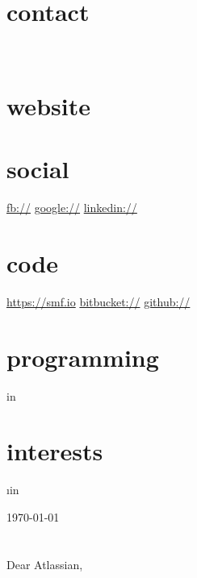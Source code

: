 \documentclass[]{fancy-cv}
\newcommand\company{Atlassian}
\begin{document}
\header{\MakeLowercase\myfirstname}{\MakeLowercase\mylastname}{\MakeLowercase\mytitle}

\begin{aside}
  \section{contact}
    \href{mailto:\myemail}{\myemail}
    ~
    \myphone
    ~
    \myaddress%
    \mycity
  \section{website}
    \href{\mywebsite}{\mywebsite}
  \section{social}
    \href{http://facebook.com/\myfb}{fb://\myfb}
    \href{http://plug.google.com/\mygp}{google://\mygp}
    \href{http://www.linkedin.com/in/\mylinkedin}{linkedin://\mylinkedin}
  \section{code}
    \href{https://smf.io}{https://smf.io}
    \href{https://bitbucket.org/\myfb}{bitbucket://\myfb}
    \href{https://github.com/\myfb}{github://\myfb}
  \section{programming}
     \lang in \programming {%
      \lang
    }%
  \section{interests}
     \i in \interests {%
      \MakeLowercase\i
    }%
\end{aside}

\vspace{.8em}
\large
\today\\
\\
\\
Dear \company,
\end{document}

